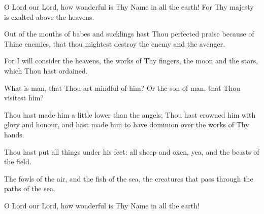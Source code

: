O Lord our Lord, how wonderful is Thy Name in all the earth! For Thy majesty is exalted above the heavens.

Out of the mouths of babes and sucklings hast Thou perfected praise because of Thine enemies, that thou mightest destroy the enemy and the avenger.

For I will consider the heavens, the works of Thy fingers, the moon and the stars, which Thou hast ordained.

What is man, that Thou art mindful of him? Or the son of man, that Thou visitest him?

Thou hast made him a little lower than the angels; Thou hast crowned him with glory and honour, and hast made him to have dominion over the works of Thy hands.

Thou hast put all things under his feet: all sheep and oxen, yea, and the beasts of the field.

The fowls of the air, and the fish of the sea, the creatures that pass through the paths of the sea.

O Lord our Lord, how wonderful is Thy Name in all the earth!
